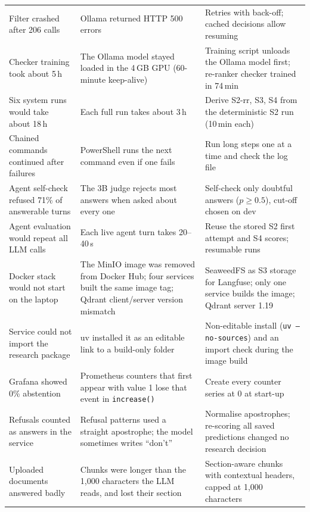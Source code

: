 \documentclass[11pt,a4paper]{report}
\newcommand{\sys}[1]{\textsf{#1}}
\begin{document}
\begin{longtable}{@{}p{4.3cm}p{5.2cm}p{5.3cm}@{}}
Filter crashed after 206 calls & Ollama returned HTTP 500 errors & Retries with back-off; cached decisions allow resuming \\
Checker training took about 5\,h & The Ollama model stayed loaded in the 4\,GB GPU (60-minute keep-alive) & Training script unloads the Ollama model first; re-ranker checker trained in 74\,min \\
Six system runs would take about 18\,h & Each full run takes about 3\,h & Derive \sys{S2-rr}, \sys{S3}, \sys{S4} from the deterministic \sys{S2} run (10\,min each) \\
Chained commands continued after failures & PowerShell runs the next command even if one fails & Run long steps one at a time and check the log file \\
Agent self-check refused 71\% of answerable turns & The 3B judge rejects most answers when asked about every one & Self-check only doubtful answers ($p \ge 0.5$), cut-off chosen on dev \\
Agent evaluation would repeat all LLM calls & Each live agent turn takes 20--40\,s & Reuse the stored S2 first attempt and S4 scores; resumable runs \\
Docker stack would not start on the laptop & The MinIO image was removed from Docker Hub; four services built the same image tag; Qdrant client/server version mismatch & SeaweedFS as S3 storage for Langfuse; only one service builds the image; Qdrant server 1.19 \\
Service could not import the research package & uv installed it as an editable link to a build-only folder & Non-editable install (\texttt{uv --no-sources}) and an import check during the image build \\
Grafana showed 0\% abstention & Prometheus counters that first appear with value 1 lose that event in \texttt{increase()} & Create every counter series at 0 at start-up \\
Refusals counted as answers in the service & Refusal patterns used a straight apostrophe; the model sometimes writes ``don\textquoteright t'' & Normalise apostrophes; re-scoring all saved predictions changed no research decision \\
Uploaded documents answered badly & Chunks were longer than the 1{,}000 characters the LLM reads, and lost their section & Section-aware chunks with contextual headers, capped at 1{,}000 characters \\
\bottomrule
\end{longtable}
\end{document}
